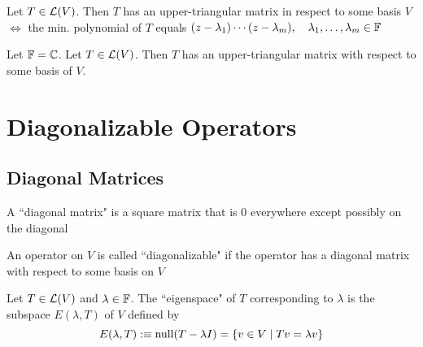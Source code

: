\setcounter{thm}{43}
\begin{thm}
  \label{thm:necessary and sufficient condition to have an upper-triangular-matrix}
  Let $T\in \mathcal{L}(V)$\footnotemark[1]. Then $T$ has an upper-triangular matrix in respect to some basis $V$ $\iff$ the min. polynomial of $T$ equals $(z-\lambda_1) \cdots (z-\lambda_m), \quad \lambda_1, \dots, \lambda_m \in \mathbb{F}$
\end{thm}

\begin{thm}
  \label{If-F-equals-C-every-operator-on-V-has-an-upper-triangular-matrix}
  Let $\mathbb{F} = \mathbb{C}$. Let $T\in \mathcal{L} (V)$\footnotemark[1]. Then $T$ has an upper-triangular matrix with respect to some basis of $V$.
\end{thm}

\setcounter{footnote}{1}

\pagebreak

\section{Diagonalizable Operators}
\subsection{Diagonal Matrices}

\setcounter{thm}{47}
\begin{mydef}
  A ``diagonal matrix" is a square matrix that is $0$ everywhere except possibly on \nopagebreak the diagonal
\end{mydef}

\setcounter{thm}{49}
\begin{mydef}
  An operator on $V$ is called ``diagonalizable" if the operator has a diagonal matrix with respect to some basis on $V$
\end{mydef}

\setcounter{thm}{51}
\label{eigenspace}
\begin{mydef}
  Let $T \in \mathcal{L}(V)$ and $\lambda \in \mathbb{F}$. The ``eigenspace" of $T$ corresponding to $\lambda$ is the subspace $E(\lambda, T)$ of $V$ defined by
  \begin{equation}
    E(\lambda, T) :\equiv  \operatorname{null}(T-\lambda I) = \{ v\in V \mid Tv = \lambda v\}
  \end{equation}
\end{mydef}

